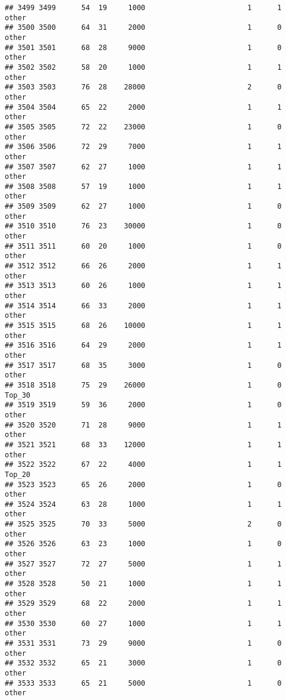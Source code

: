 \documentclass[
]{article}
\begin{document}
\begin{verbatim}
## 3499 3499      54  19     1000                        1      1    other
## 3500 3500      64  31     2000                        1      0    other
## 3501 3501      68  28     9000                        1      0    other
## 3502 3502      58  20     1000                        1      1    other
## 3503 3503      76  28    28000                        2      0    other
## 3504 3504      65  22     2000                        1      1    other
## 3505 3505      72  22    23000                        1      0    other
## 3506 3506      72  29     7000                        1      1    other
## 3507 3507      62  27     1000                        1      1    other
## 3508 3508      57  19     1000                        1      1    other
## 3509 3509      62  27     1000                        1      0    other
## 3510 3510      76  23    30000                        1      0    other
## 3511 3511      60  20     1000                        1      0    other
## 3512 3512      66  26     2000                        1      1    other
## 3513 3513      60  26     1000                        1      1    other
## 3514 3514      66  33     2000                        1      1    other
## 3515 3515      68  26    10000                        1      1    other
## 3516 3516      64  29     2000                        1      1    other
## 3517 3517      68  35     3000                        1      0    other
## 3518 3518      75  29    26000                        1      0   Top_30
## 3519 3519      59  36     2000                        1      0    other
## 3520 3520      71  28     9000                        1      1    other
## 3521 3521      68  33    12000                        1      1    other
## 3522 3522      67  22     4000                        1      1   Top_20
## 3523 3523      65  26     2000                        1      0    other
## 3524 3524      63  28     1000                        1      1    other
## 3525 3525      70  33     5000                        2      0    other
## 3526 3526      63  23     1000                        1      0    other
## 3527 3527      72  27     5000                        1      1    other
## 3528 3528      50  21     1000                        1      1    other
## 3529 3529      68  22     2000                        1      1    other
## 3530 3530      60  27     1000                        1      1    other
## 3531 3531      73  29     9000                        1      0    other
## 3532 3532      65  21     3000                        1      0    other
## 3533 3533      65  21     5000                        1      0    other

\end{verbatim}
\end{document}
